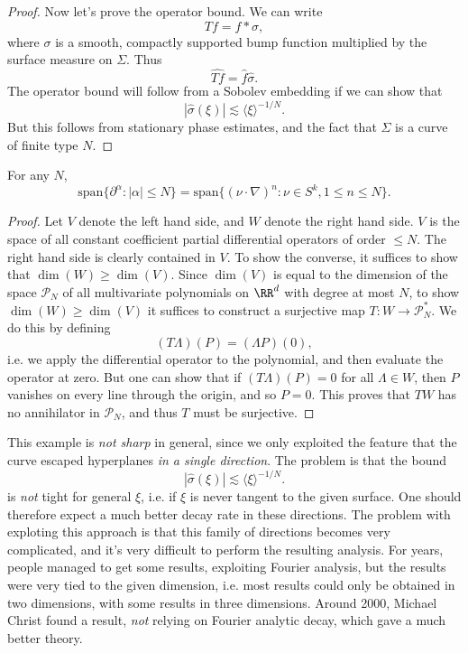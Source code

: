 \begin{proof}
    Now let's prove the operator bound. We can write
    \[ Tf = f * \sigma,  \]
    where $\sigma$ is a smooth, compactly supported bump function multiplied by the surface measure on $\Sigma$. Thus
    \[ \widehat{Tf} = \widehat{f} \widehat{\sigma}. \]
    The operator bound will follow from a Sobolev embedding if we can show that
    \[ |\widehat{\sigma}(\xi)| \lesssim \langle \xi \rangle^{-1/N}. \]
    But this follows from stationary phase estimates, and the fact that $\Sigma$ is a curve of finite type $N$.
\end{proof}

\begin{lemma}
    For any $N$,
    \[ \text{span} \{ \partial^\alpha : |\alpha| \leq N \} = \text{span} \{ (\nu \cdot \nabla)^n : \nu \in S^k, 1 \leq n \leq N \}. \]
\end{lemma}
\begin{proof}
    Let $V$ denote the left hand side, and $W$ denote the right hand side. $V$ is the space of all constant coefficient partial differential operators of order $\leq N$. The right hand side is clearly contained in $V$. To show the converse, it suffices to show that $\dim(W) \geq \dim(V)$. Since $\dim(V)$ is equal to the dimension of the space $\mathcal{P}_N$ of all multivariate polynomials on $\RR^d$ with degree at most $N$, to show $\dim(W) \geq \dim(V)$ it suffices to construct a surjective map $T: W \to \mathcal{P}_N^*$. We do this by defining
    \[ (T\Lambda)(P) = (\Lambda P)(0), \]
    i.e. we apply the differential operator to the polynomial, and then evaluate the operator at zero. But one can show that if $(T \Lambda)(P) = 0$ for all $\Lambda \in W$, then $P$ vanishes on every line through the origin, and so $P = 0$. This proves that $TW$ has no annihilator in $\mathcal{P}_N$, and thus $T$ must be surjective.
\end{proof}

This example is \emph{not sharp} in general, since we only exploited the feature that the curve escaped hyperplanes \emph{in a single direction}. The problem is that the bound
%
\[ |\widehat{\sigma}(\xi)| \lesssim \langle \xi \rangle^{-1/N}. \]
%
is \emph{not} tight for general $\xi$, i.e. if $\xi$ is never tangent to the given surface. One should therefore expect a much better decay rate in these directions. The problem with exploting this approach is that this family of directions becomes very complicated, and it's very difficult to perform the resulting analysis. For years, people managed to get some results, exploiting Fourier analysis, but the results were very tied to the given dimension, i.e. most results could only be obtained in two dimensions, with some results in three dimensions. Around 2000, Michael Christ found a result, \emph{not} relying on Fourier analytic decay, which gave a much better theory.

